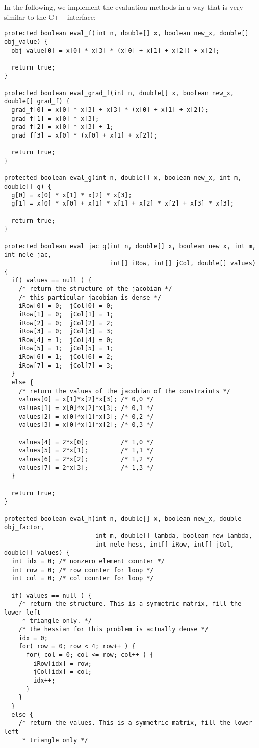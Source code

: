 \documentclass[10pt]{article}
\begin{document}
\noindent In the following, we implement the evaluation methods in a way that 
is very similar to the C++ interface:
\begin{verbatim}
protected boolean eval_f(int n, double[] x, boolean new_x, double[] obj_value) {
  obj_value[0] = x[0] * x[3] * (x[0] + x[1] + x[2]) + x[2];

  return true;
}

protected boolean eval_grad_f(int n, double[] x, boolean new_x, double[] grad_f) {
  grad_f[0] = x[0] * x[3] + x[3] * (x[0] + x[1] + x[2]);
  grad_f[1] = x[0] * x[3];
  grad_f[2] = x[0] * x[3] + 1;
  grad_f[3] = x[0] * (x[0] + x[1] + x[2]);

  return true;
}

protected boolean eval_g(int n, double[] x, boolean new_x, int m, double[] g) {
  g[0] = x[0] * x[1] * x[2] * x[3];
  g[1] = x[0] * x[0] + x[1] * x[1] + x[2] * x[2] + x[3] * x[3];

  return true;
}

protected boolean eval_jac_g(int n, double[] x, boolean new_x, int m, int nele_jac,
                             int[] iRow, int[] jCol, double[] values) {
  if( values == null ) {
    /* return the structure of the jacobian */
    /* this particular jacobian is dense */
    iRow[0] = 0;  jCol[0] = 0;
    iRow[1] = 0;  jCol[1] = 1;
    iRow[2] = 0;  jCol[2] = 2;
    iRow[3] = 0;  jCol[3] = 3;
    iRow[4] = 1;  jCol[4] = 0;
    iRow[5] = 1;  jCol[5] = 1;
    iRow[6] = 1;  jCol[6] = 2;
    iRow[7] = 1;  jCol[7] = 3;
  }
  else {
    /* return the values of the jacobian of the constraints */
    values[0] = x[1]*x[2]*x[3]; /* 0,0 */
    values[1] = x[0]*x[2]*x[3]; /* 0,1 */
    values[2] = x[0]*x[1]*x[3]; /* 0,2 */
    values[3] = x[0]*x[1]*x[2]; /* 0,3 */

    values[4] = 2*x[0];         /* 1,0 */
    values[5] = 2*x[1];         /* 1,1 */
    values[6] = 2*x[2];         /* 1,2 */
    values[7] = 2*x[3];         /* 1,3 */
  }

  return true;
}

protected boolean eval_h(int n, double[] x, boolean new_x, double obj_factor,
                         int m, double[] lambda, boolean new_lambda,
                         int nele_hess, int[] iRow, int[] jCol, double[] values) {
  int idx = 0; /* nonzero element counter */
  int row = 0; /* row counter for loop */
  int col = 0; /* col counter for loop */
  
  if( values == null ) {
    /* return the structure. This is a symmetric matrix, fill the lower left
     * triangle only. */
    /* the hessian for this problem is actually dense */
    idx = 0;
    for( row = 0; row < 4; row++ ) {
      for( col = 0; col <= row; col++ ) {
        iRow[idx] = row;
        jCol[idx] = col;
        idx++;
      }
    }
  }
  else {
    /* return the values. This is a symmetric matrix, fill the lower left
     * triangle only */


\end{verbatim}
\end{document}
